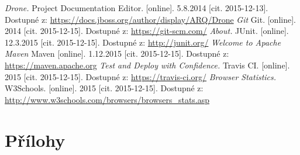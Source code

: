\documentclass[
    color,   %
	table,   %
    twoside, %
]{fithesis3}
\begin{document}
\begin{thebibliography}{9}
\emph{Drone.} Project Documentation Editor. [online]. 5.8.2014 [cit. 2015-12-13]. Dostupné z: \url{https://docs.jboss.org/author/display/ARQ/Drone}
\emph{Git} Git. [online]. 2014 [cit. 2015-12-15]. Dostupné z: \url{https://git-scm.com/}
\emph{About.} JUnit. [online]. 12.3.2015 [cit. 2015-12-15]. Dostupné z: \url{http://junit.org/}
\emph{Welcome to Apache Maven} Maven [online]. 1.12.2015 [cit. 2015-12-15]. Dostupné z: \url{https://maven.apache.org}
\emph{Test and Deploy with Confidence.} Travis CI. [online]. 2015 [cit. 2015-12-15]. Dostupné z: \url{https://travis-ci.org/}
\emph{Browser Statistics.} W3Schools. [online]. 2015 [cit. 2015-12-15]. Dostupné z: \url{http://www.w3schools.com/browsers/browsers_stats.asp}
\end{thebibliography}

\chapter{Přílohy}
\end{document}
